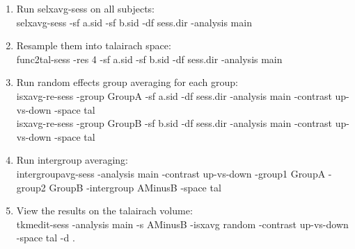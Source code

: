 \documentclass[10pt]{article}
\begin{document}
\begin{enumerate}
\item Run selxavg-sess on all subjects: \\
selxavg-sess -sf a.sid -sf b.sid -df sess.dir -analysis main
\item Resample them into talairach space:\\
func2tal-sess -res 4 -sf a.sid -sf b.sid -df sess.dir -analysis main
\item Run random effects group averaging for each group:\\
isxavg-re-sess -group GroupA -sf a.sid -df sess.dir -analysis main
-contrast up-vs-down -space tal\\
isxavg-re-sess -group GroupB -sf b.sid -df sess.dir -analysis main
-contrast up-vs-down -space tal\\
\item Run intergroup averaging:\\
intergroupavg-sess -analysis main -contrast up-vs-down -group1 GroupA
-group2 GroupB -intergroup AMinusB -space tal\\
\item View the results on the talairach volume:\\
tkmedit-sess -analysis main -s AMinusB -isxavg random -contrast
up-vs-down  -space tal -d .\\
\end{enumerate}
\end{document}
